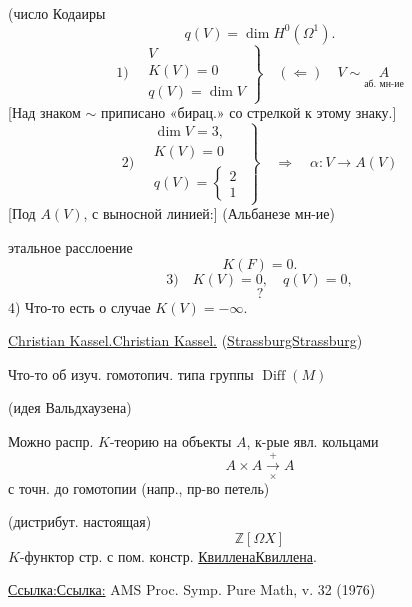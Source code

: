 \documentclass[11pt]{article}
\theoremstyle{definition}
\theoremstyle{remark}
\let\DiplomaticMathUnderline\underline
\renewcommand{\underline}[1]{\ifmmode\DiplomaticMathUnderline{#1}\else\uline{#1}\fi}
\begin{document}
(число Кодаиры
\begin{equation*}
q(V)=\dim H^0(\Omega^1).
\end{equation*}
\begin{equation*}
1)\quad
\left.\begin{gathered}
V\\K(V)=0\\q(V)=\dim V
\end{gathered}\right\}
\quad(\Leftarrow)\quad
V\sim\underset{\text{аб. мн-ие}}{A}
\end{equation*}
[Над знаком $\sim$ приписано «бирац.» со стрелкой к этому знаку.]
\begin{equation*}
2)\quad
\left.\begin{gathered}
\dim V=3,\\K(V)=0\\q(V)=\begin{cases}2\\1\end{cases}
\end{gathered}\right\}
\quad\Rightarrow\quad
\alpha\colon V\to A(V)
\end{equation*}
[Под $A(V)$, с выносной линией:] (Альбанезе мн-ие)

этальное расслоение
\begin{equation*}
K(F)=0.
\end{equation*}
\begin{equation*}
3)\quad K(V)=0,\quad q(V)=0,
\end{equation*}
\begin{equation*}
?
\end{equation*}
4) Что-то есть о случае $K(V)=-\infty$.

\underline{Christian Kassel.} (\underline{Strassburg})

Что-то об изуч. гомотопич. типа группы $\operatorname{Diff}(M)$

(идея Вальдхаузена)

Можно распр. $K$-теорию на объекты $A$, к-рые явл. кольцами
\begin{equation*}
A\times A\overset{+}{\underset{\times}{\longrightarrow}}A
\end{equation*}
с точн. до гомотопии (напр., пр-во петель)

(дистрибут. настоящая)
\begin{equation*}
\mathbb Z[\Omega X]
\end{equation*}
$K$-функтор стр. с пом. констр. \underline{Квиллена}.

\underline{Ссылка:} AMS Proc. Symp. Pure Math, v. 32 (1976)
\end{document}
